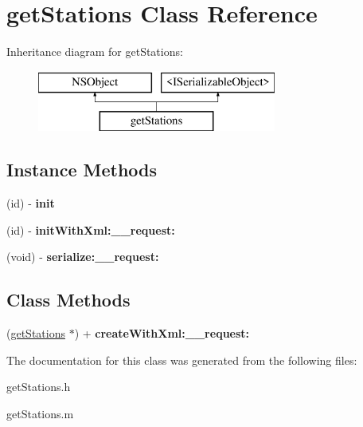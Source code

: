 \hypertarget{interfaceget_stations}{}\section{get\+Stations Class Reference}
\label{interfaceget_stations}
Inheritance diagram for get\+Stations\+:\begin{figure}[H]
\begin{center}
\leavevmode
\includegraphics[height=2.000000cm]{interfaceget_stations}
\end{center}
\end{figure}
\subsection*{Instance Methods}
\begin{DoxyCompactItemize}
\item 
\hypertarget{interfaceget_stations_a5778f71aaef8289d5cef0b1edd0c02b4}{}(id) -\/ {\bfseries init}\label{interfaceget_stations_a5778f71aaef8289d5cef0b1edd0c02b4}

\item 
\hypertarget{interfaceget_stations_ab8a47cb16693eaaa4fe75c1f5b098d89}{}(id) -\/ {\bfseries init\+With\+Xml\+:\+\_\+\+\_\+request\+:}\label{interfaceget_stations_ab8a47cb16693eaaa4fe75c1f5b098d89}

\item 
\hypertarget{interfaceget_stations_acf4553a705f75803850f6cfe98c195c0}{}(void) -\/ {\bfseries serialize\+:\+\_\+\+\_\+request\+:}\label{interfaceget_stations_acf4553a705f75803850f6cfe98c195c0}

\end{DoxyCompactItemize}
\subsection*{Class Methods}
\begin{DoxyCompactItemize}
\item 
\hypertarget{interfaceget_stations_a06468ee86d0b39dba722951ee9db1549}{}(\hyperlink{interfaceget_stations}{get\+Stations} $\ast$) + {\bfseries create\+With\+Xml\+:\+\_\+\+\_\+request\+:}\label{interfaceget_stations_a06468ee86d0b39dba722951ee9db1549}

\end{DoxyCompactItemize}


The documentation for this class was generated from the following files\+:\begin{DoxyCompactItemize}
\item 
get\+Stations.\+h\item 
get\+Stations.\+m\end{DoxyCompactItemize}
